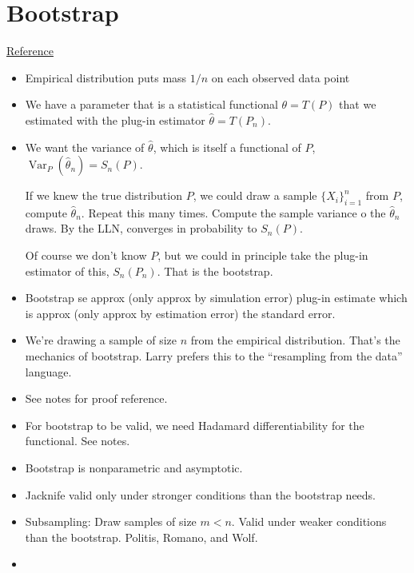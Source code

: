 \documentclass[12pt]{article}
\theoremstyle{plain}
\theoremstyle{definition}
\theoremstyle{remark}
\newcommand{\Var}{\operatorname{Var}}
\begin{document}
\clearpage
\section{Bootstrap}

\href{http://www.stat.cmu.edu/~larry/=stat705/Lecture13.pdf}{Reference}
\begin{itemize}
  \item
    Empirical distribution puts mass $1/n$ on each observed data point
  \item We have a parameter that is a statistical functional
    $\theta=T(P)$ that we estimated with the plug-in estimator
    $\hat{\theta}=T(P_n)$.
  \item We want the variance of $\hat{\theta}$, which is itself a
    functional of $P$, $\Var_P(\hat{\theta}_n)=S_n(P)$.

    If we knew the true distribution $P$, we could draw a sample
    $\{X_i\}_{i=1}^n$ from $P$, compute $\hat{\theta}_n$.
    Repeat this many times.
    Compute the sample variance o the $\hat{\theta}_n$ draws.
    By the LLN, converges in probability to $S_n(P)$.

    Of course we don't know $P$, but we could in principle take the
    plug-in estimator of this, $S_n(P_n)$.
    That is the bootstrap.

  \item
    Bootstrap se approx (only approx by simulation error) plug-in
    estimate which is approx (only approx by estimation error) the
    standard error.

  \item We're drawing a sample of size $n$ from the empirical
    distribution. That's the mechanics of bootstrap.
    Larry prefers this to the ``resampling from the data'' language.

  \item See notes for proof reference.

  \item For bootstrap to be valid, we need Hadamard differentiability
    for the functional. See notes.

  \item Bootstrap is nonparametric and asymptotic.

  \item Jacknife valid only under stronger conditions than the
    bootstrap needs.

  \item Subsampling:
    Draw samples of size $m<n$.
    Valid under weaker conditions than the bootstrap.
    Politis, Romano, and Wolf.

  \item
\end{itemize}
\end{document}
